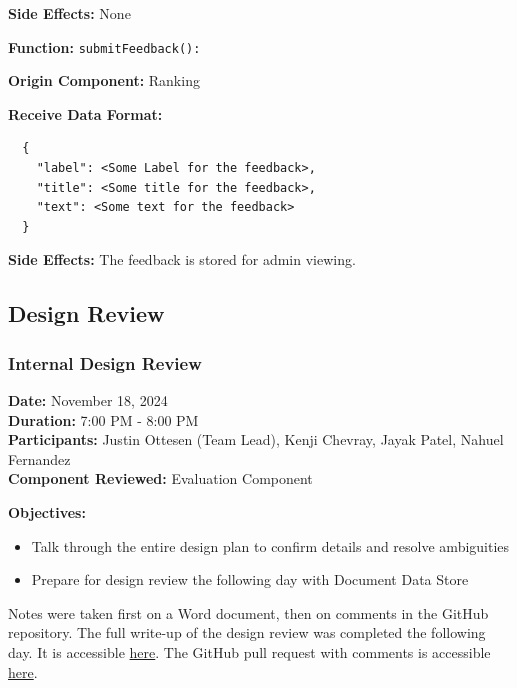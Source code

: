 \smallskip

\textbf{Side Effects:} None

\bigskip

\textbf{Function:} \verb|submitFeedback():|

\smallskip

\textbf{Origin Component:} Ranking

\smallskip

\textbf{Receive Data Format:} \begin{verbatim}
  {
    "label": <Some Label for the feedback>,
    "title": <Some title for the feedback>,
    "text": <Some text for the feedback>
  }
\end{verbatim}

\smallskip

\textbf{Side Effects:} The feedback is stored for admin viewing.

\newpage
\subsection*{Design Review}

\subsubsection*{Internal Design Review}

\textbf{Date:} November 18, 2024 \\
\textbf{Duration:} 7:00 PM - 8:00 PM \\
\textbf{Participants:} Justin Ottesen (Team Lead), Kenji Chevray, Jayak Patel, Nahuel Fernandez \\
\textbf{Component Reviewed:} Evaluation Component

\medskip

\textbf{Objectives:}
\begin{itemize}
  \item Talk through the entire design plan to confirm details and resolve ambiguities
  \item Prepare for design review the following day with Document Data Store
\end{itemize}
Notes were taken first on a Word document, then on comments in the GitHub repository. The full write-up of the design review was completed the following day. It is accessible \href{https://docs.google.com/document/d/1REwOedsmrtoQbACQpFj3Ti8JiCDlrIysBp8OR26vRdU/edit?tab=t.0}{here}. The GitHub pull request with comments is accessible \href{https://github.com/justinottesen/LSPT-Evaluation/pull/27/commits/00ec74d93f1943b2d434e28471a2d04adcd9872c#diff-b335630551682c19a781afebcf4d07bf978fb1f8ac04c6bf87428ed5106870f5}{here}.

